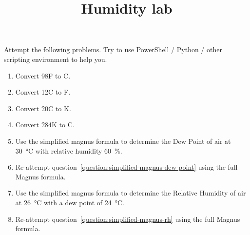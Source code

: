 \documentclass{pgnotes}
\title{Humidity lab}
\begin{document}
\maketitle

Attempt the following problems.
Try to use PowerShell / Python / other scripting environment to help you. 

\begin{enumerate}

\item
  Convert 98F to C.

\item
  Convert 12C to F.

\item
  Convert 20C to K.

\item
  Convert 284K to C.
  
\item
  \label{question:simplified-magnus-dew-point}
  Use the simplified magnus formula to determine the Dew Point of air at \SI{30}{\celsius} with relative humidity \SI{60}{\percent}.

\item
  Re-attempt question~\ref{question:simplified-magnus-dew-point} using the full Magnus formula.
  
\item
  \label{question:simplified-magnus-rh}  
  Use the simplified magnus formula to determine the Relative Humidity of air at \SI{26}{\celsius} with a dew point of \SI{24}{\celsius}. 

\item
  Re-attempt question~\ref{question:simplified-magnus-rh} using the full Magnus formula.

  
\end{enumerate}
\end{document}
